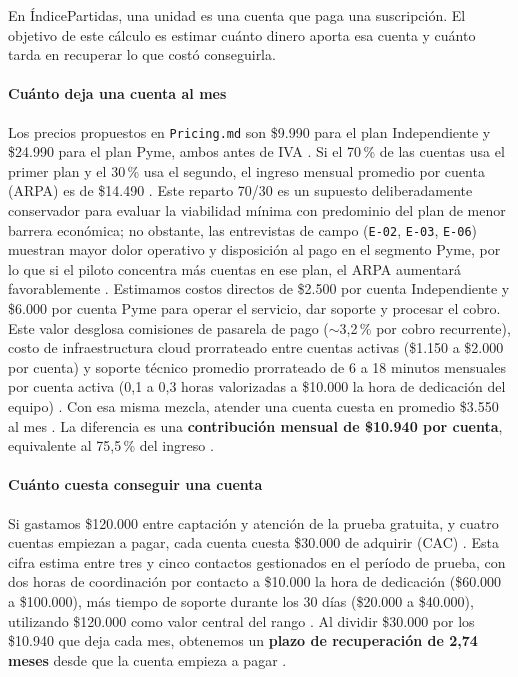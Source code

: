 En ÍndicePartidas, una unidad es una cuenta que paga una suscripción.
El objetivo de este cálculo es estimar cuánto dinero aporta esa cuenta
y cuánto tarda en recuperar lo que costó conseguirla.

\paragraph{Cuánto deja una cuenta al mes}
Los precios propuestos en \texttt{Pricing.md} son \$9.990 para el plan
Independiente y \$24.990 para el plan Pyme, ambos antes de IVA \hip.
Si el 70\,\% de las cuentas usa el primer plan y el 30\,\% usa el segundo,
el ingreso mensual promedio por cuenta (ARPA) es de \$14.490 \hip.
Este reparto 70/30 es un supuesto deliberadamente conservador para evaluar
la viabilidad mínima con predominio del plan de menor barrera económica;
no obstante, las entrevistas de campo (\texttt{E-02}, \texttt{E-03}, \texttt{E-06})
muestran mayor dolor operativo y disposición al pago en el segmento Pyme,
por lo que si el piloto concentra más cuentas en ese plan, el ARPA aumentará
favorablemente \hip.
Estimamos costos directos de \$2.500 por cuenta Independiente y \$6.000 por
cuenta Pyme para operar el servicio, dar soporte y procesar el cobro.
Este valor desglosa comisiones de pasarela de pago ($\sim$3,2\,\% por cobro recurrente),
costo de infraestructura cloud prorrateado entre cuentas activas (\$1.150 a \$2.000
por cuenta) y soporte técnico promedio prorrateado de 6 a 18 minutos mensuales por
cuenta activa (0,1 a 0,3 horas valorizadas a \$10.000 la hora de dedicación del equipo) \hip.
Con esa misma mezcla, atender una cuenta cuesta en promedio \$3.550 al mes
\hip. La diferencia es una \textbf{contribución mensual de \$10.940 por
cuenta}, equivalente al 75,5\,\% del ingreso \hip.

\paragraph{Cuánto cuesta conseguir una cuenta}
Si gastamos \$120.000 entre captación y atención de la prueba gratuita,
y cuatro cuentas empiezan a pagar, cada cuenta cuesta \$30.000 de adquirir
(CAC) \hip. Esta cifra estima entre tres y cinco contactos gestionados en el período
de prueba, con dos horas de coordinación por contacto a \$10.000 la hora de dedicación
(\$60.000 a \$100.000), más tiempo de soporte durante los 30 días (\$20.000 a \$40.000),
utilizando \$120.000 como valor central del rango \hip. Al dividir \$30.000 por
los \$10.940 que deja cada mes, obtenemos un \textbf{plazo de recuperación de 2,74 meses}
desde que la cuenta empieza a pagar \hip.

